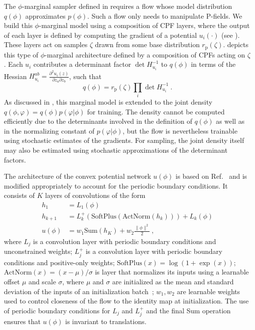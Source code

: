 \documentclass[aps,prd,twocolumn,nofootinbib,superscriptaddress,preprintnumbers]{revtex4-1}
\begin{document}
The $\phi$-marginal sampler defined in  requires a flow whose model distribution $q(\phi)$ approximates $p(\phi)$. Such a flow only needs to manipulate P-fields. We build this $\phi$-marginal model using a composition of CPF layers, where the output of each layer is defined by computing the gradient of a potential $u_i(\cdot)$ (see ). These layers act on samples $\zeta$ drawn from some base distribution $r_{\mathrm{p}}(\zeta)$.  depicts this type of $\phi$-marginal architecture defined by a composition of CPFs acting on $\zeta$. Each $u_i$ contributes a determinant factor $\det H_{u_i}^{-1}$ to $q(\phi)$ in terms of the Hessian $H_{u_i}^{ab} = \frac{\partial^2 u_i(z)}{\partial z_a \partial z_b}$, such that
%
\begin{equation}
    q(\phi) = r_{\mathrm{p}}(\zeta)\prod_i \det H_{u_i} ^{-1}\ .
\end{equation}
%
As discussed in , this marginal model is extended to the joint density $q(\phi, \varphi) = q(\phi)p(\varphi | \phi)$ for training. The density cannot be computed efficiently due to the determinants involved in the definition of $q(\phi)$ as well as in the normalizing constant of $p(\varphi|\phi)$, but the flow is nevertheless trainable using stochastic estimates of the gradients. For sampling, the joint density itself may also be estimated using stochastic approximations of the determinant factors.

The architecture of the convex potential network $u(\phi)$ is based on Ref.~\cite{huang2020convex} and is modified appropriately to account for the periodic boundary conditions. It consists of $K$ layers of convolutions of the form
%
\begin{equation}\label{eq:cpf-conv}
\begin{aligned}
    h_1 &= L_1(\phi) \\
    h_{k+1} &= L_k^+(\text{SoftPlus}(\text{ActNorm}(h_k))) + L_k(\phi) \\
    u(\phi) &= w_1 \text{Sum}(h_K) + w_2 \frac{\| \phi \|^2}{2}\ ,
\end{aligned}
\end{equation}
%
where $L_j$ is a convolution layer with periodic boundary conditions and unconstrained weights; $L_j^+$ is a convolution layer with periodic boundary conditions and positive-only weights; $\text{SoftPlus}(x) = \log(1 + \exp(x))$; $\text{ActNorm}(x)=(x - \mu)/\sigma$ is layer that normalizes its inputs using a learnable offset $\mu$ and scale $\sigma$, where $\mu$ and $\sigma$ are initialized as the mean and standard deviation of the inputs of an initialization batch~\cite{NEURIPS2018_d139db6a}; $w_1,w_2$ are learnable weights used to control closeness of the flow to the identity map at initialization. The use of periodic boundary conditions for $L_j$ and $L_j^+$ and the final Sum operation ensures that $u(\phi)$ is invariant to translations.
\end{document}
